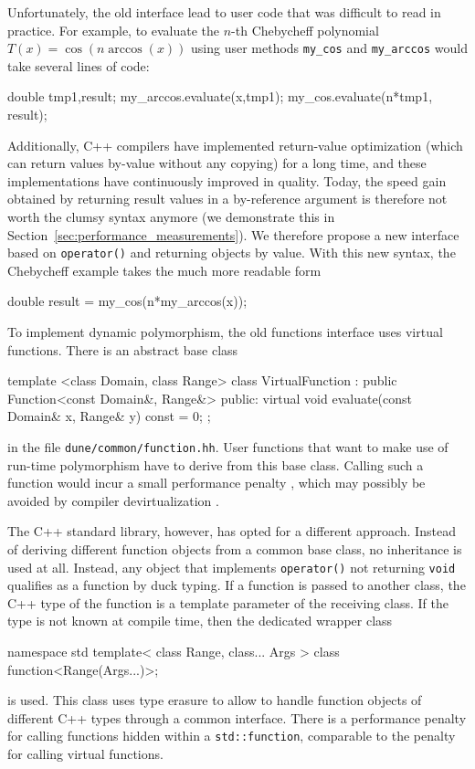 \documentclass[11pt,
                 numbers=noenddot,
                 headings=normal,
                 DIV16, BCOR10mm]{scrartcl}
\newcommand{\cpp}{\lstinline}
\theoremstyle{remark}
\newcommand{\file}[1]{\texttt{#1}}
\begin{document}
Unfortunately, the old interface lead to user code that was difficult to read in practice.  For example, to
evaluate the $n$-th Chebycheff polynomial $T(x) = \cos(n\arccos(x))$ using user methods \cpp{my_cos} and
\cpp{my_arccos} would take several lines of code:
\begin{c++}
double tmp1,result;
my_arccos.evaluate(x,tmp1);
my_cos.evaluate(n*tmp1, result);
\end{c++}
Additionally, C++ compilers have implemented return-value optimization (which can return values by-value
without any copying) for a long time, and these implementations have continuously improved in quality.
Today, the speed gain obtained by returning result values in a by-reference argument is therefore not worth
the clumsy syntax anymore (we demonstrate this in Section~\ref{sec:performance_measurements}).
We therefore propose a new interface based on \cpp{operator()} and returning objects by value.  With this
new syntax, the Chebycheff example takes the much more readable form
\begin{c++}
double result = my_cos(n*my_arccos(x));
\end{c++}

To implement dynamic polymorphism, the old functions interface uses virtual functions.
There is an abstract base class
\begin{c++}
template <class Domain, class Range>
class VirtualFunction :
  public Function<const Domain&, Range&>
{
public:
  virtual void evaluate(const Domain& x, Range& y) const = 0;
};
\end{c++}
in the file \file{dune/common/function.hh}.  User functions that want to make use of run-time polymorphism
have to derive from this base class.  Calling such a function would incur
a small performance penalty \cite{driesen_hoelzle:1996},
which may possibly be avoided by compiler devirtualization \cite{hubicka:2014}.


The C++ standard library, however, has opted for a different approach.  Instead of deriving different function objects
from a common base class, no inheritance is used at all.  Instead, any object that implements \cpp{operator()} not
returning \cpp{void} qualifies as a function by duck typing.  If a function is passed to another class, the C++ type
of the function is a template parameter of the receiving class.  If the type is not known at compile time, then the
dedicated wrapper class
\begin{c++}
namespace std
{
  template< class Range, class... Args >
  class function<Range(Args...)>;
}
\end{c++}
is used.  This class uses type erasure to allow to handle function objects of different C++ types through a common
interface.  There is a performance penalty for calling functions hidden within a \cpp{std::function}, comparable to
the penalty for calling virtual functions.
\end{document}
